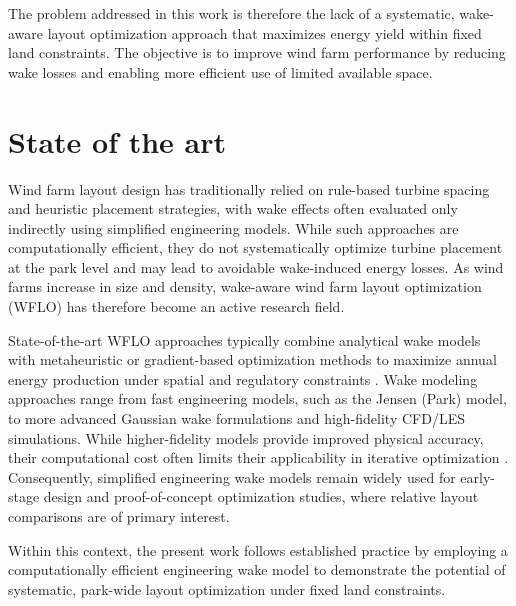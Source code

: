 \documentclass[lettersize,journal]{IEEEtran}
\begin{document}
The problem addressed in this work is therefore the lack of a systematic, wake-aware layout optimization approach that maximizes energy yield within fixed land constraints. The objective is to improve wind farm performance by reducing wake losses and enabling more efficient use of limited available space.


\section{State of the art}

Wind farm layout design has traditionally relied on rule-based turbine spacing and heuristic placement strategies, with wake effects often evaluated only indirectly using simplified engineering models. While such approaches are computationally efficient, they do not systematically optimize turbine placement at the park level and may lead to avoidable wake-induced energy losses. As wind farms increase in size and density, wake-aware wind farm layout optimization (WFLO) has therefore become an active research field\cite{dtuStateOfArtWFLO}.

State-of-the-art WFLO approaches typically combine analytical wake models with metaheuristic or gradient-based optimization methods to maximize annual energy production under spatial and regulatory constraints \cite{herbertacero2014review}\cite{thomas2023wflo}. Wake modeling approaches range from fast engineering models, such as the Jensen (Park) model, to more advanced Gaussian wake formulations and high-fidelity CFD/LES simulations. While higher-fidelity models provide improved physical accuracy, their computational cost often limits their applicability in iterative optimization \cite{bastankhah2014gaussian}. Consequently, simplified engineering wake models remain widely used for early-stage design and proof-of-concept optimization studies, where relative layout comparisons are of primary interest\cite{katic1986park}.

Within this context, the present work follows established practice by employing a computationally efficient engineering wake model to demonstrate the potential of systematic, park-wide layout optimization under fixed land constraints.


\end{document}
